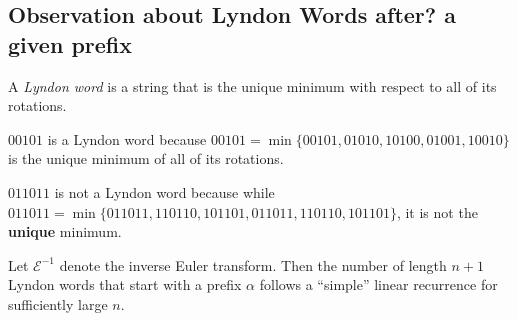 \subsection{Observation about Lyndon Words after? a given prefix}
\begin{definition}
  A \textit{Lyndon word} is a string that is the unique minimum with respect
  to all of its rotations.
\end{definition}
\begin{example}
  $00101$ is a Lyndon word because
  $00101 = \min\{00101, 01010, 10100, 01001, 10010\}$ is the unique minimum of
  all of its rotations.

  $011011$ is not a Lyndon word because while $011011 = \min\{011011, 110110, 101101, 011011, 110110, 101101\}$,
  it is not the \textbf{unique} minimum.
\end{example}
\begin{conjecture}
  Let $\mathcal{E}^{-1}$ denote the inverse Euler transform.
  Then the number of length $n+1$ Lyndon words that start with a prefix
  $\alpha$ follows a ``simple'' linear recurrence for sufficiently large $n$.
\end{conjecture}
